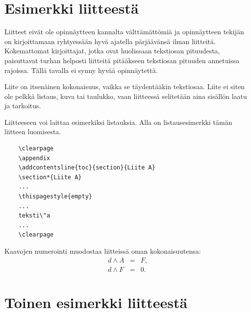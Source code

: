 \documentclass[english, 12pt, a4paper, elec, utf8, a-1b, online]{aaltothesis}
\begin{document}
\clearpage

\thesisappendix

\section{Esimerkki liitteest\"a\label{LiiteA}}

Liitteet eiv\"at ole opinn\"aytteen kannalta v\"altt\"am\"att\"omi\"a ja 
opinn\"aytteen tekij\"an on 
kirjoittamaan ryhtyess\"a\"an hyv\"a ajatella p\"arj\"a\"av\"ans\"a ilman liitteit\"a.
Kokemattomat kirjoittajat, jotka ovat huolissaan
tekstiosan pituudesta, paisuttavat turhan 
helposti liitteit\"a pit\"a\"akseen tekstiosan pituuden annetuissa rajoissa.
T\"all\"a tavalla ei synny hyv\"a\"a opinn\"aytett\"a.   

Liite on itsen\"ainen kokonaisuus, vaikka se t\"aydent\"a\"akin tekstiosaa.
Liite ei siten ole pelkk\"a listaus, kuva tai taulukko, vaan 
liitteess\"a selitet\"a\"an aina sis\"all\"on laatu ja tarkoitus. 

Liitteeseen voi laittaa esimerkiksi listauksia. Alla on 
listausesimerkki t\"am\"an liitteen luomisesta. 

\begin{verbatim}
	\clearpage
	\appendix
	\addcontentsline{toc}{section}{Liite A}
	\section*{Liite A}
	...
	\thispagestyle{empty}
	...
	teksti\"a
	...
	\clearpage
\end{verbatim}

Kaavojen numerointi muodostaa liitteiss\"a oman kokonaisuutensa:
\begin{eqnarray}
d \wedge A  &=& F, \label{liitekaava1}\\
d \wedge F  &=& 0. \label{liitekaava2}
\end{eqnarray}


\clearpage
\section{Toinen esimerkki liitteest\"a\label{LiiteB}}
\end{document}
